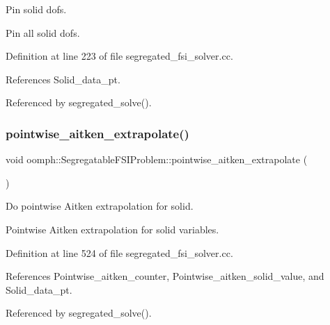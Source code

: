 Pin solid dofs. 

Pin all solid dofs. 

Definition at line 223 of file segregated\+\_\+fsi\+\_\+solver.\+cc.



References Solid\+\_\+data\+\_\+pt.



Referenced by segregated\+\_\+solve().

\mbox{\label{classoomph_1_1SegregatableFSIProblem_a99a457e1b3c17e9a08590db163eb7118}} 
\subsubsection{\texorpdfstring{pointwise\+\_\+aitken\+\_\+extrapolate()}{pointwise\_aitken\_extrapolate()}}
{\footnotesize\ttfamily void oomph\+::\+Segregatable\+F\+S\+I\+Problem\+::pointwise\+\_\+aitken\+\_\+extrapolate (\begin{DoxyParamCaption}{ }\end{DoxyParamCaption})\hspace{0.3cm}{\ttfamily [protected]}}



Do pointwise Aitken extrapolation for solid. 

Pointwise Aitken extrapolation for solid variables. 

Definition at line 524 of file segregated\+\_\+fsi\+\_\+solver.\+cc.



References Pointwise\+\_\+aitken\+\_\+counter, Pointwise\+\_\+aitken\+\_\+solid\+\_\+value, and Solid\+\_\+data\+\_\+pt.



Referenced by segregated\+\_\+solve().

\mbox{\label{classoomph_1_1SegregatableFSIProblem_a61cad9a0a75f2999c0529caa9cac2b73}} 
